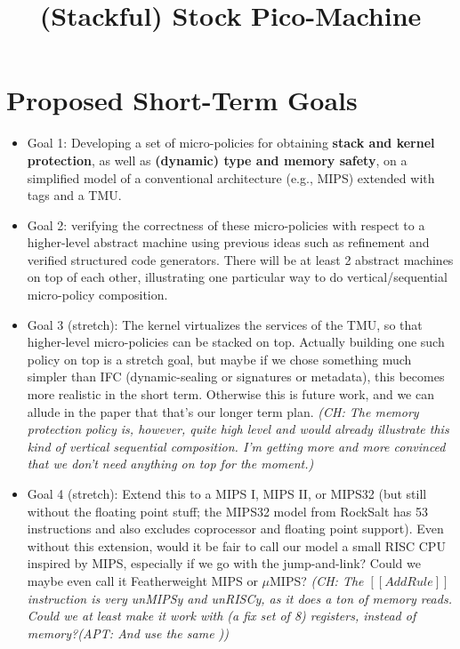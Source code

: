 \documentclass{article}
\newcommand{\ch}[1]{{\color{dkblue}\em (CH: #1)}}
\newcommand{\apt}[1]{{\color{red}\em (APT: #1)}}
\newcommand*{\EG}{e.g.,\xspace}
\begin{document}
\title{(Stackful) Stock Pico-Machine}
\maketitle

\section{Proposed Short-Term Goals}

\begin{itemize}
\item Goal 1: Developing a set of micro-policies for obtaining {\bf
    stack and kernel protection}, as well as {\bf (dynamic) type and
    memory safety}, on a simplified model of a conventional
  architecture (\EG MIPS) extended with tags and a TMU.
\item Goal 2: verifying the correctness of these micro-policies with
  respect to a higher-level abstract machine using previous ideas such
  as refinement and verified structured code generators. There will be
  at least 2 abstract machines on top of each other, illustrating one
  particular way to do vertical/sequential micro-policy composition.
\item Goal 3 (stretch): The kernel virtualizes the services
  of the TMU, so that higher-level micro-policies can be stacked
  on top. Actually building one such policy on top is a stretch goal,
  but maybe if we chose something much simpler than IFC
  (dynamic-sealing or signatures or metadata), this becomes more
  realistic in the short term. Otherwise this is future work, and we
  can allude in the paper that that's our longer term plan.
  \ch{The memory protection policy is, however, quite high level
      and would already illustrate this kind of vertical sequential
      composition. I'm getting more and more convinced that we don't
      need anything on top for the moment.}
\item Goal 4 (stretch): Extend this to a MIPS I, MIPS II, or MIPS32
  (but still without the floating point stuff; the MIPS32 model
  from RockSalt has 53 instructions and also excludes coprocessor and
  floating point support). Even without this
  extension, would it be fair to call our model a small RISC CPU
  inspired by MIPS, especially if we go with the jump-and-link?
  Could we maybe even call it Featherweight MIPS or $\mu$MIPS?
  \ch{The $[[AddRule]]$ instruction is very unMIPSy and unRISCy, as it
    does a ton of memory reads. Could we at least make it work with (a
    fix set of 8) registers, instead of memory?\apt{And use the same
}}
\end{itemize}
\end{document}

